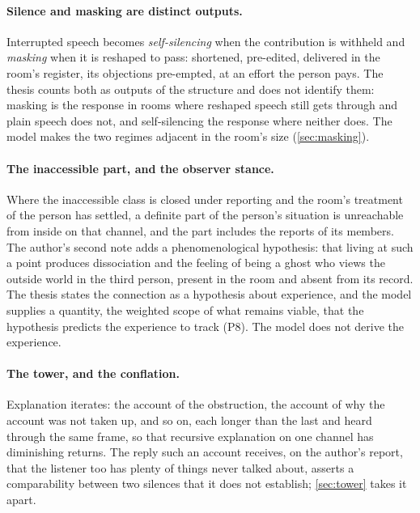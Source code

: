 \paragraph{Silence and masking are distinct outputs.} Interrupted speech becomes \emph{self-silencing} when the contribution is withheld and \emph{masking} when it is reshaped to pass: shortened, pre-edited, delivered in the room's register, its objections pre-empted, at an effort the person pays. The thesis counts both as outputs of the structure and does not identify them: masking is the response in rooms where reshaped speech still gets through and plain speech does not, and self-silencing the response where neither does. The model makes the two regimes adjacent in the room's size (\autoref{sec:masking}).

\paragraph{The inaccessible part, and the observer stance.} Where the inaccessible class is closed under reporting and the room's treatment of the person has settled, a definite part of the person's situation is unreachable from inside on that channel, and the part includes the reports of its members. The author's second note adds a phenomenological hypothesis: that living at such a point produces dissociation and the feeling of being a ghost who views the outside world in the third person, present in the room and absent from its record. The thesis states the connection as a hypothesis about experience, and the model supplies a quantity, the weighted scope of what remains viable, that the hypothesis predicts the experience to track (P8). The model does not derive the experience.

\paragraph{The tower, and the conflation.} Explanation iterates: the account of the obstruction, the account of why the account was not taken up, and so on, each longer than the last and heard through the same frame, so that recursive explanation on one channel has diminishing returns. The reply such an account receives, on the author's report, that the listener too has plenty of things never talked about, asserts a comparability between two silences that it does not establish; \autoref{sec:tower} takes it apart.

